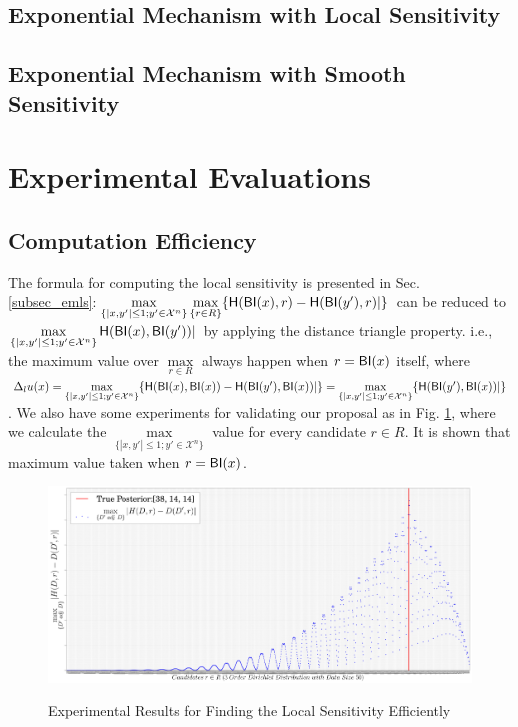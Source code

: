 \subsection{Exponential Mechanism with Local Sensitivity}


\subsection{Exponential Mechanism with Smooth Sensitivity}


\section{Experimental Evaluations}
\subsection{Computation Efficiency}
The formula for computing the local sensitivity is presented in Sec. \ref{subsec_emls}:$\max\limits_{\{|x,y'| \leq 1; y'\in \mathcal{X}^n\}}\max\limits_{\{r\in R\}} \{\mathsf{H}(\mathsf{BI}(x), r) - \mathsf{H}(\mathsf{BI}(y'), r)|\}$ can be reduced to $\max\limits_{\{|x,y'| \leq 1;y'\in \mathcal{X}^n\}}\mathsf{H}(\mathsf{BI}(x), \mathsf{BI}(y'))|$ by applying the distance triangle property. i.e., the maximum value over $\max\limits_{r \in R}$ always happen when $r = \mathsf{BI}(x)$ itself, where $\Delta_{l}u(x) = \max\limits_{\{|x,y'| \leq 1;y'\in \mathcal{X}^n\}} \{\mathsf{H}(\mathsf{BI}(x), \mathsf{BI}(x)) - \mathsf{H}(\mathsf{BI}(y'), \mathsf{BI}(x))|\} = \max\limits_{\{|x,y'| \leq 1;y'\in \mathcal{X}^n\}} \{\mathsf{H}(\mathsf{BI}(y'), \mathsf{BI}(x))|\}$. We also have some experiments for validating our proposal as in Fig. \ref{fig_efficiency}, where we calculate the $\max\limits_{\{|x,y'| \leq 1;y'\in \mathcal{X}^n\}}$ value for every candidate $r \in R$. It is shown that maximum value taken when  $r = \mathsf{BI}(x)$.

 \begin{figure}[h]
\centering
\includegraphics[width=1.0\textwidth]{efficiency}
\label{fig_efficiency}
\caption{Experimental Results for Finding the Local Sensitivity Efficiently}
\end{figure}

